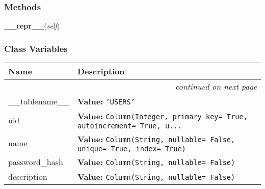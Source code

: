   \subsubsection{Methods}

    \label{acl_database:Users:__repr__}

    \vspace{0.5ex}

\hspace{.8\funcindent}\begin{boxedminipage}{\funcwidth}

    \raggedright \textbf{\_\_repr\_\_}(\textit{self})

\setlength{\parskip}{2ex}
\setlength{\parskip}{1ex}
    \end{boxedminipage}



  \subsubsection{Class Variables}

    \vspace{-1cm}
\hspace{\varindent}\begin{longtable}{|p{\varnamewidth}|p{\vardescrwidth}|l}
\cline{1-2}
\cline{1-2} \centering \textbf{Name} & \centering \textbf{Description}& \\
\cline{1-2}
\endhead\cline{1-2}\multicolumn{3}{r}{\small\textit{continued on next page}}\\\endfoot\cline{1-2}
\endlastfoot\raggedright \_\-\_\-t\-a\-b\-l\-e\-n\-a\-m\-e\-\_\-\_\- & \raggedright \textbf{Value:} 
{\tt 'USERS'}&\\
\cline{1-2}
\raggedright u\-i\-d\- & \raggedright \textbf{Value:} 
{\tt Column(Integer, primary\_key= True, autoincrement= True, u\texttt{...}}&\\
\cline{1-2}
\raggedright n\-a\-m\-e\- & \raggedright \textbf{Value:} 
{\tt Column(String, nullable= False, unique= True, index= True)}&\\
\cline{1-2}
\raggedright p\-a\-s\-s\-w\-o\-r\-d\-\_\-h\-a\-s\-h\- & \raggedright \textbf{Value:} 
{\tt Column(String, nullable= False)}&\\
\cline{1-2}
\raggedright d\-e\-s\-c\-r\-i\-p\-t\-i\-o\-n\- & \raggedright \textbf{Value:} 
{\tt Column(String, nullable= False)}&\\
\cline{1-2}
\end{longtable}


